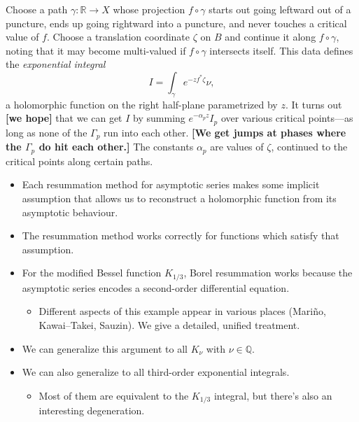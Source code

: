 \documentclass{article}
\newcommand{\maps}{\colon}
\newcommand{\R}{\mathbb{R}}
\begin{document}
\begin{itemize}
\color{Turquoise}
Choose a path $\gamma \maps \R \to X$ whose projection $f \circ \gamma$ starts out going leftward out of a puncture, ends up going rightward into a puncture, and never touches a critical value of $f$. Choose a translation coordinate $\zeta$ on $B$ and continue it along $f \circ \gamma$, noting that it may become multi-valued if $f \circ \gamma$ intersects itself. This data defines the {\em exponential integral}
\[ I = \int_\gamma e^{-z f^*\zeta} \nu, \]
a holomorphic function on the right half-plane parametrized by $z$. It turns out \textbf{[we hope]} that we can get $I$ by summing $e^{-\alpha_p z} I_p$ over various critical points---as long as none of the $\Gamma_p$ run into each other. \textbf{[We get jumps at phases where the $\Gamma_p$ do hit each other.]} The constants $\alpha_p$ are values of $\zeta$, continued to the critical points along certain paths.
\color{black}
\end{itemize}
\begin{itemize}
\item Each resummation method for asymptotic series makes some implicit assumption that allows us to reconstruct a holomorphic function from its asymptotic behaviour.
\item The resummation method works correctly for functions which satisfy that assumption.
\item For the modified Bessel function $K_{1/3}$, Borel resummation works because the asymptotic series encodes a second-order differential equation.
\begin{itemize}
\item Different aspects of this example appear in various places (Mari\~{n}o, Kawai--Takei, Sauzin). We give a detailed, unified treatment.
\end{itemize}
\item We can generalize this argument to all $K_\nu$ with $\nu \in \mathbb{Q}$.
\item We can also generalize to all third-order exponential integrals.
\begin{itemize}
\item Most of them are equivalent to the $K_{1/3}$ integral, but there's also an interesting degeneration.
\end{itemize}
\end{itemize}
\end{document}

